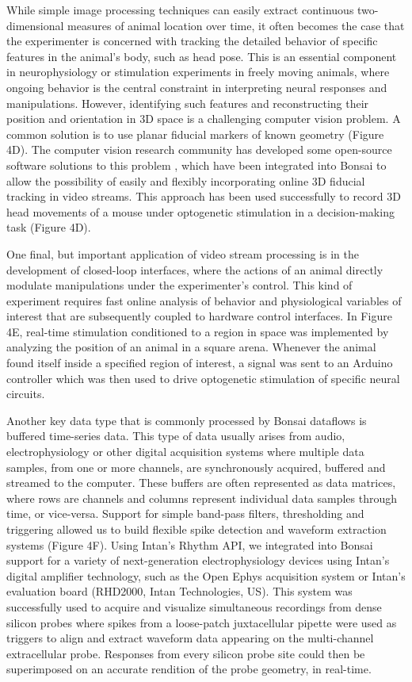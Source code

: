While simple image processing techniques can easily extract continuous two-dimensional measures of animal location over time, it often becomes the case that the experimenter is concerned with tracking the detailed behavior of specific features in the animal's body, such as head pose. This is an essential component in neurophysiology or stimulation experiments in freely moving animals, where ongoing behavior is the central constraint in interpreting neural responses and manipulations. However, identifying such features and reconstructing their position and orientation in 3D space is a challenging computer vision problem. A common solution is to use planar fiducial markers of known geometry \cite{Kato1999, Garrido-Jurado2014} (Figure 4D). The computer vision research community has developed some open-source software solutions to this problem \cite{Garrido-Jurado2014}, which have been integrated into Bonsai to allow the possibility of easily and flexibly incorporating online 3D fiducial tracking in video streams. This approach has been used successfully to record 3D head movements of a mouse under optogenetic stimulation in a decision-making task (Figure 4D).

One final, but important application of video stream processing is in the development of closed-loop interfaces, where the actions of an animal directly modulate manipulations under the experimenter's control. This kind of experiment requires fast online analysis of behavior and physiological variables of interest that are subsequently coupled to hardware control interfaces. In Figure 4E, real-time stimulation conditioned to a region in space was implemented by analyzing the position of an animal in a square arena. Whenever the animal found itself inside a specified region of interest, a signal was sent to an Arduino controller which was then used to drive optogenetic stimulation of specific neural circuits.

Another key data type that is commonly processed by Bonsai dataflows is buffered time-series data. This type of data usually arises from audio, electrophysiology or other digital acquisition systems where multiple data samples, from one or more channels, are synchronously acquired, buffered and streamed to the computer. These buffers are often represented as data matrices, where rows are channels and columns represent individual data samples through time, or vice-versa. Support for simple band-pass filters, thresholding and triggering allowed us to build flexible spike detection and waveform extraction systems (Figure 4F). Using Intan's Rhythm API, we integrated into Bonsai support for a variety of next-generation electrophysiology devices using Intan's digital amplifier technology, such as the Open Ephys acquisition system \cite{Voigts2013} or Intan's evaluation board (RHD2000, Intan Technologies, US). This system was successfully used to acquire and visualize simultaneous recordings from dense silicon probes where spikes from a loose-patch juxtacellular pipette were used as triggers to align and extract waveform data appearing on the multi-channel extracellular probe. Responses from every silicon probe site could then be superimposed on an accurate rendition of the probe geometry, in real-time.

